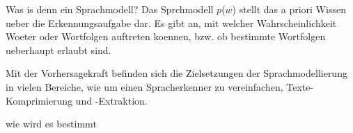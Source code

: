 
Was is denn ein Sprachmodell? Das Sprchmodell $p$($w$) stellt das a priori Wissen ueber die Erkennungsaufgabe dar.
Es gibt an, mit welcher Wahrscheinlichkeit Woeter oder Wortfolgen auftreten koennen, bzw. 
ob bestimmte Wortfolgen ueberhaupt erlaubt sind. 

Mit der Vorhersagekraft befinden sich die Zielsetzungen der Sprachmodellierung  in vielen Bereiche, wie um einen Spracherkenner zu vereinfachen, Texte-Komprimierung und -Extraktion. 

wie wird es bestimmt
